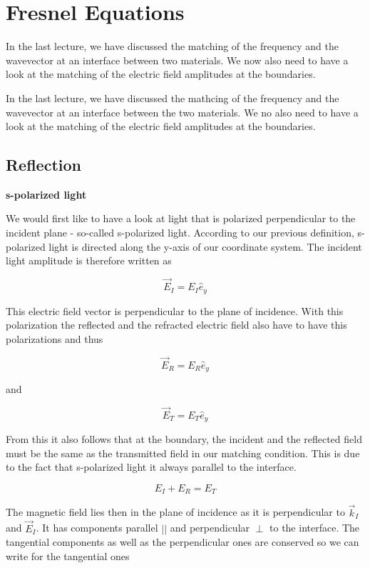 \documentclass[
  a4paper,
]{book}
\begin{document}
\chapter{Fresnel Equations}\label{fresnel-equations}

In the last lecture, we have discussed the matching of the frequency and
the wavevector at an interface between two materials. We now also need
to have a look at the matching of the electric field amplitudes at the
boundaries.

In the last lecture, we have discussed the mathcing of the frequency and
the wavevector at an interface between the two materials. We no also
need to have a look at the matching of the electric field amplitudes at
the boundaries.

\section{Reflection}\label{reflection-1}

\textbf{s-polarized light}

We would first like to have a look at light that is polarized
perpendicular to the incident plane - so-called s-polarized light.
According to our previous definition, s-polarized light is directed
along the y-axis of our coordinate system. The incident light amplitude
is therefore written as

\[
\vec{E}_I=E_I\hat{e}_y
\]

This electric field vector is perpendicular to the plane of incidence.
With this polarization the reflected and the refracted electric field
also have to have this polarizations and thus

\[
\vec{E}_R=E_{R}\hat{e}_y
\]

and

\[
\vec{E}_T=E_{T}\hat{e}_y
\]

From this it also follows that at the boundary, the incident and the
reflected field must be the same as the transmitted field in our
matching condition. This is due to the fact that s-polarized light it
always parallel to the interface.

\[
E_I+E_R=E_T
\tag{matching}
\]

The magnetic field lies then in the plane of incidence as it is
perpendicular to \(\vec{k}_I\) and \(\vec{E}_I\). It has components
parallel \(||\) and perpendicular \(\perp\) to the interface. The
tangential components as well as the perpendicular ones are conserved so
we can write for the tangential ones
\end{document}
